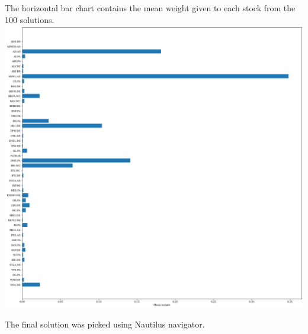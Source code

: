 \documentclass[11pt]{article} %
\begin{document}
The horizontal bar chart contains the mean weight given to each stock from the 100 solutions.
\hspace*{-1.5cm}
\includegraphics[scale=0.45]{meanW}

The final solution was picked using Nautilus navigator. 


\printbibliography %
\end{document}
